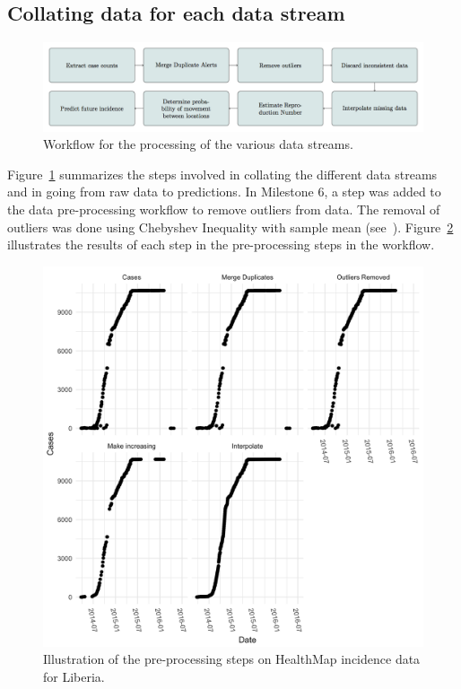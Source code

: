 \documentclass[11pt,]{article}
\begin{document}
\subsection{Collating data for each data stream}
\begin{center}
\begin{figure}
\includegraphics[]{ms6-figures/workflow}
\caption{Workflow for the processing of the various data streams.}
\label{fig:workflow}
\end{figure}
\end{center}

Figure~\ref{fig:workflow} summarizes the steps involved in collating
the different data streams and in going from raw data to predictions. In Milestone 6, a step was added to the data pre-processing workflow
to remove outliers from data. The removal of outliers was done using Chebyshev Inequality
with sample mean (see~\cite{saw1984chebyshev}). Figure~\ref{fig:wf_example} illustrates
the results of each step in the pre-processing steps in the workflow.

\begin{figure}
  \centering
  \includegraphics{ms6-figures/liberia-preprocessing}
  \caption{Illustration of the pre-processing steps on HealthMap incidence
    data for Liberia.}
  \label{fig:wf_example}
\end{figure}
\end{document}
